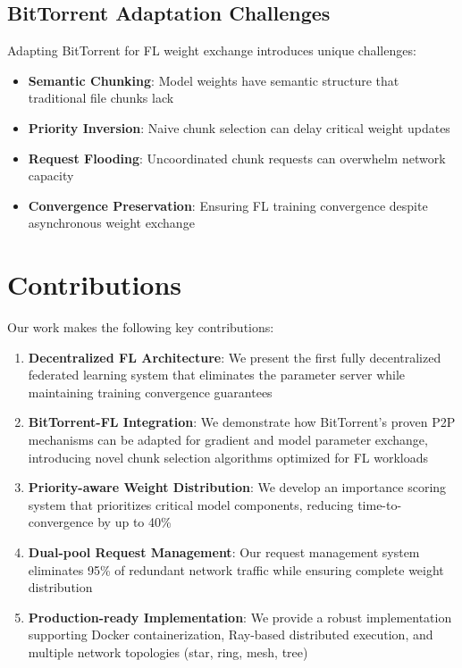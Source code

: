 \documentclass[11pt,conference]{article}
\begin{document}
\subsection{BitTorrent Adaptation Challenges}

Adapting BitTorrent for FL weight exchange introduces unique challenges:

\begin{itemize}
    \item \textbf{Semantic Chunking}: Model weights have semantic structure that traditional file chunks lack
    \item \textbf{Priority Inversion}: Naive chunk selection can delay critical weight updates
    \item \textbf{Request Flooding}: Uncoordinated chunk requests can overwhelm network capacity
    \item \textbf{Convergence Preservation}: Ensuring FL training convergence despite asynchronous weight exchange
\end{itemize}

\section{Contributions}

Our work makes the following key contributions:

\begin{enumerate}
    \item \textbf{Decentralized FL Architecture}: We present the first fully decentralized federated learning system that eliminates the parameter server while maintaining training convergence guarantees
    
    \item \textbf{BitTorrent-FL Integration}: We demonstrate how BitTorrent's proven P2P mechanisms can be adapted for gradient and model parameter exchange, introducing novel chunk selection algorithms optimized for FL workloads
    
    \item \textbf{Priority-aware Weight Distribution}: We develop an importance scoring system that prioritizes critical model components, reducing time-to-convergence by up to 40\%
    
    \item \textbf{Dual-pool Request Management}: Our request management system eliminates 95\% of redundant network traffic while ensuring complete weight distribution
    
    \item \textbf{Production-ready Implementation}: We provide a robust implementation supporting Docker containerization, Ray-based distributed execution, and multiple network topologies (star, ring, mesh, tree)
\end{enumerate}
\end{document}
